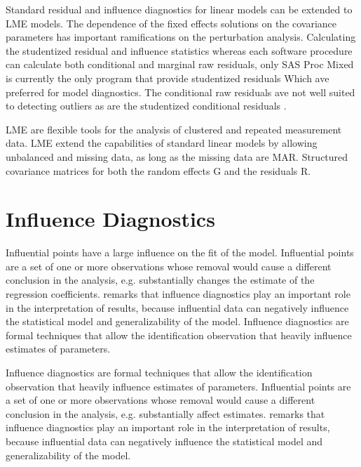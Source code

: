 \documentclass[]{report}
\begin{document}
Standard residual and influence diagnostics for linear models can be extended to LME models. The dependence of the fixed effects solutions on the covariance parameters has important ramifications on the perturbation analysis. Calculating the studentized residual and influence statistics whereas each software procedure can calculate both conditional and marginal raw residuals, only SAS Proc Mixed is currently the only program that provide studentized residuals Which ave preferred for model diagnostics. The conditional raw residuals ave not well suited to detecting outliers as are the studentized conditional residuals \citep{schabenberger}.



LME are flexible tools for the analysis of clustered and repeated measurement data. LME extend the capabilities of standard linear models by allowing unbalanced and missing data, as long as the missing data are MAR. Structured covariance matrices for both the random effects G and the residuals R. 


\section{Influence Diagnostics}

	


	
Influential points have a large influence on the fit of the model. Influential points are a set of one or more observations whose removal would cause a different conclusion in the analysis, e.g. substantially changes the estimate of the regression coefficients. \citet{west} remarks that influence diagnostics play an important role in the interpretation of results, because influential data can negatively influence the statistical model and generalizability of the model. Influence diagnostics are formal techniques that allow the identification observation that heavily influence estimates of parameters.



Influence diagnostics are formal techniques that allow the identification observation that heavily influence estimates of parameters.
Influential points are a set of one or more observations whose removal would cause a different conclusion in the analysis, e.g. substantially affect estimates. \citet{west} remarks that influence diagnostics play an important role in the interpretation of results, because influential data can negatively influence the statistical model and generalizability of the model.
\end{document}
